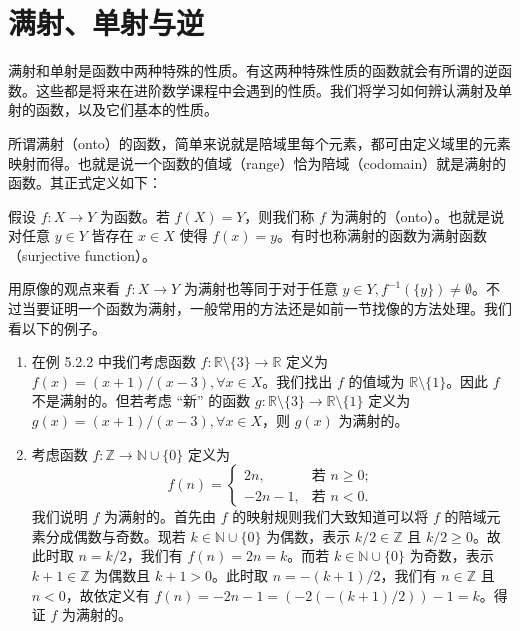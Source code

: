 \section{满射、单射与逆}

满射和单射是函数中两种特殊的性质。有这两种特殊性质的函数就会有所谓的逆函数。这些都是将来在进阶数学课程中会遇到的性质。我们将学习如何辨认满射及单射的函数，以及它们基本的性质。

所谓满射（onto）的函数，简单来说就是陪域里每个元素，都可由定义域里的元素映射而得。也就是说一个函数的值域（range）恰为陪域（codomain）就是满射的函数。其正式定义如下：

\begin{definition}
假设 $f : X \to Y$ 为函数。若 $f(X) = Y$，则我们称 $f$ 为满射的（onto）。也就是说对任意 $y \in Y$ 皆存在 $x \in X$ 使得 $f(x) = y$。有时也称满射的函数为满射函数（surjective function）。
\end{definition}

用原像的观点来看 $f : X \to Y$ 为满射也等同于对于任意 $y \in Y, f^{-1}(\{y\}) \neq \emptyset$。不过当要证明一个函数为满射，一般常用的方法还是如前一节找像的方法处理。我们看以下的例子。

\begin{example}
\begin{enumerate}
    \item 在例 5.2.2 中我们考虑函数 $f : \mathbb{R} \setminus \{3\} \to \mathbb{R}$ 定义为 $f(x) = (x + 1)/(x - 3), \forall x \in X$。我们找出 $f$ 的值域为 $\mathbb{R} \setminus \{1\}$。因此 $f$ 不是满射的。但若考虑 “新” 的函数 $g : \mathbb{R} \setminus \{3\} \to \mathbb{R} \setminus \{1\}$ 定义为 $g(x) = (x + 1)/(x - 3), \forall x \in X$，则 $g(x)$ 为满射的。
    \item 考虑函数 $f : \mathbb{Z} \to \mathbb{N} \cup \{0\}$ 定义为
    $$ f(n) = \begin{cases} 2n, & \text{若 } n \geq 0; \\ -2n - 1, & \text{若 } n < 0. \end{cases} $$
    我们说明 $f$ 为满射的。首先由 $f$ 的映射规则我们大致知道可以将 $f$ 的陪域元素分成偶数与奇数。现若 $k \in \mathbb{N} \cup \{0\}$ 为偶数，表示 $k/2 \in \mathbb{Z}$ 且 $k/2 \geq 0$。故此时取 $n = k/2$，我们有 $f(n) = 2n = k$。而若 $k \in \mathbb{N} \cup \{0\}$ 为奇数，表示 $k + 1 \in \mathbb{Z}$ 为偶数且 $k + 1 > 0$。此时取 $n = -(k + 1)/2$，我们有 $n \in \mathbb{Z}$ 且 $n < 0$，故依定义有 $f(n) = -2n - 1 = (-2(-(k + 1)/2)) - 1 = k$。得证 $f$ 为满射的。
\end{enumerate}
\end{example}


